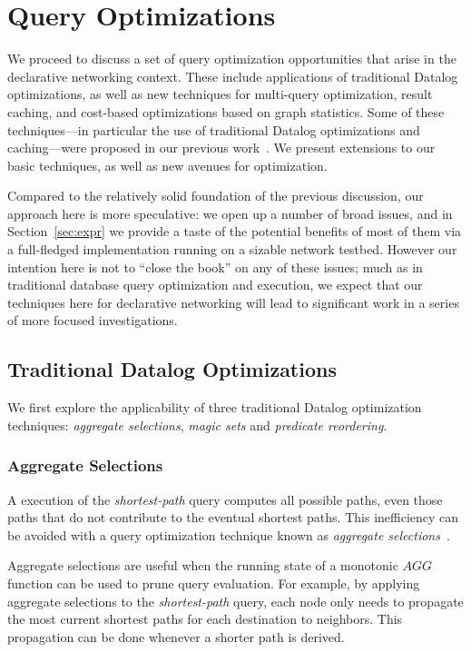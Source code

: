 \section{Query Optimizations}
\label{sec:queryOpt}
We proceed to discuss a set of query optimization opportunities
that arise in the declarative networking context.  These include
applications of traditional Datalog optimizations, as well as new
techniques for multi-query optimization, result caching, and
cost-based optimizations based on graph statistics. Some of these
techniques---in particular the use of traditional Datalog
optimizations and caching---were proposed in our previous
work~\cite{declareRoute}. We present extensions to our basic
techniques, as well as new avenues for optimization. 

Compared to the relatively solid foundation of the previous discussion,
 our approach here is more speculative: we open up a number of broad issues, and in
Section~\ref{sec:expr} we provide a taste of the potential benefits of
most of them via a full-fledged implementation running on a sizable
network testbed.  However our intention here is not to ``close the
book'' on any of these issues; much as in traditional database query
optimization and execution, we expect that our techniques here for
declarative networking will lead to significant work in a series of
more focused investigations.


\subsection{Traditional Datalog Optimizations}

We first explore the applicability of three traditional Datalog optimization
techniques: {\em aggregate selections}, {\em magic sets} and {\em
  predicate reordering}.

\subsubsection{Aggregate Selections}
\label{subsec:aggregateSelections}

A \naive execution of the {\em shortest-path} query computes all
  possible paths, even those paths that do not contribute to the eventual shortest
  paths. This inefficiency can be avoided with a query optimization
technique known as {\em aggregate selections}~\cite{sudarshan91aggregation,zaniolo}. 

Aggregate selections are useful when the running state of a monotonic
$AGG$ function can be used to prune query evaluation. For example, by applying
aggregate selections to the {\em shortest-path} query, each node only
needs to propagate the most current shortest paths for each destination
to neighbors. This propagation can be done whenever a shorter path is
derived.  

